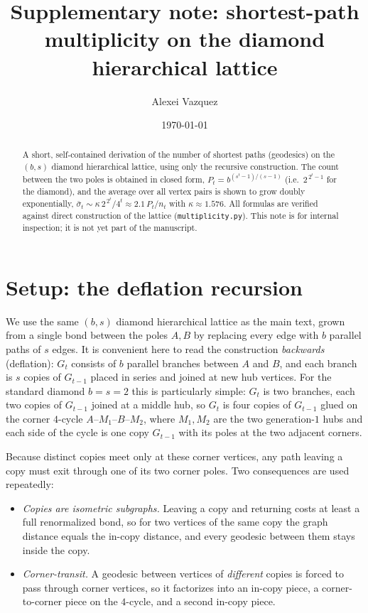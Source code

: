 \documentclass[aps,pre,onecolumn,superscriptaddress,floatfix]{revtex4-2}
\begin{document}
\title{Supplementary note: shortest-path multiplicity on the diamond
hierarchical lattice}

\author{Alexei Vazquez}
\date{\today}

\begin{abstract}
A short, self-contained derivation of the number of shortest paths (geodesics)
on the $(b,s)$ diamond hierarchical lattice, using only the recursive
construction. The count between the two poles is obtained in closed form,
$P_t=b^{(s^t-1)/(s-1)}$ (i.e.\ $2^{\,2^t-1}$ for the diamond), and the average
over all vertex pairs is shown to grow doubly exponentially,
$\bar\sigma_t\sim\kappa\,2^{\,2^t}/4^{t}\approx 2.1\,P_t/n_t$ with
$\kappa\approx1.576$. All formulas are verified against direct construction of
the lattice (\texttt{multiplicity.py}). This note is for internal inspection; it
is not yet part of the manuscript.
\end{abstract}

\maketitle

\section{Setup: the deflation recursion}
\label{sec:setup}

We use the same $(b,s)$ diamond hierarchical lattice as the main text, grown
from a single bond between the poles $A,B$ by replacing every edge with $b$
parallel paths of $s$ edges. It is convenient here to read the construction
\emph{backwards} (deflation): $G_t$ consists of $b$ parallel branches between
$A$ and $B$, and each branch is $s$ copies of $G_{t-1}$ placed in series and
joined at new hub vertices. For the standard diamond $b=s=2$ this is
particularly simple: $G_t$ is two branches, each two copies of $G_{t-1}$ joined
at a middle hub, so $G_t$ is four copies of $G_{t-1}$ glued on the corner
$4$-cycle $A\text{--}M_1\text{--}B\text{--}M_2$, where $M_1,M_2$ are the two
generation-$1$ hubs and each side of the cycle is one copy $G_{t-1}$ with its
poles at the two adjacent corners.

Because distinct copies meet only at these corner vertices, any path leaving a
copy must exit through one of its two corner poles. Two consequences are used
repeatedly:
\begin{itemize}
\item[(i)] \emph{Copies are isometric subgraphs.} Leaving a copy and returning
costs at least a full renormalized bond, so for two vertices of the same copy
the graph distance equals the in-copy distance, and every geodesic between them
stays inside the copy.
\item[(ii)] \emph{Corner-transit.} A geodesic between vertices of \emph{different}
copies is forced to pass through corner vertices, so it factorizes into an
in-copy piece, a corner-to-corner piece on the $4$-cycle, and a second in-copy
piece.
\end{itemize}
\end{document}
